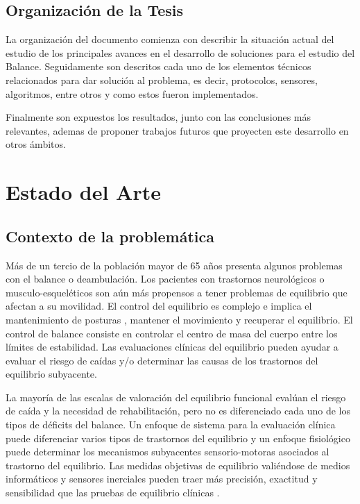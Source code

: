 \documentclass[12pt,a4paper]{article}
\begin{document}
\subsection{Organizaci\'on de la Tesis}
La organización del documento comienza con describir la situación actual del estudio de los principales avances en el desarrollo de soluciones para el estudio del Balance. Seguidamente son descritos cada uno de los elementos técnicos relacionados para dar solución al problema, es decir,  protocolos, sensores, algoritmos, entre otros y como estos fueron implementados.

Finalmente son expuestos los resultados, junto con las conclusiones más relevantes, ademas de proponer trabajos futuros que proyecten este desarrollo en otros ámbitos.


\section{Estado del Arte}

\subsection{Contexto de la problemática}
Más de un tercio de la población mayor de 65 años presenta algunos problemas con el balance o deambulación. Los pacientes con trastornos neurológicos o musculo-esqueléticos son aún más propensos a tener problemas de equilibrio que afectan a su movilidad.
El control del equilibrio es complejo e implica el mantenimiento de posturas \cite{mancini_relevance_2010}, mantener el movimiento y recuperar el equilibrio. El control de balance consiste en controlar el centro de masa del cuerpo entre los límites de estabilidad. Las evaluaciones clínicas del equilibrio pueden ayudar a evaluar el riesgo de caídas y/o determinar las causas de los trastornos del equilibrio subyacente.

La mayoría de las escalas de valoración del equilibrio funcional evalúan el riesgo de caída y la necesidad de rehabilitación, pero no es diferenciado cada uno de los tipos de déficits del balance. Un enfoque de sistema para la evaluación clínica puede diferenciar varios tipos de trastornos del equilibrio y un enfoque fisiológico puede determinar los mecanismos subyacentes sensorio-motoras asociados al trastorno del equilibrio. Las medidas objetivas de equilibrio valiéndose de medios informáticos y sensores inerciales pueden traer más precisión, exactitud y sensibilidad que las pruebas de equilibrio clínicas \cite{chaudhry_measurement_2011}.
\end{document}
